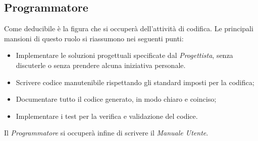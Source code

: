 \subsection{Programmatore}
Come deducibile è la figura che si occuperà dell'attività di codifica. Le principali mansioni di questo ruolo si riassumono nei seguenti punti:
\begin{itemize}
\item Implementare le soluzioni progettuali specificate dal \textit{Progettista}, senza discuterle o senza prendere alcuna iniziativa personale.
\item Scrivere codice manutenibile rispettando gli standard imposti per la codifica;
\item Documentare tutto il codice generato, in modo chiaro e coinciso;
\item Implementare i test per la verifica e validazione del codice.
\end{itemize}
Il \textit{Programmatore} si occuperà infine di scrivere il \textit{Manuale Utente}.